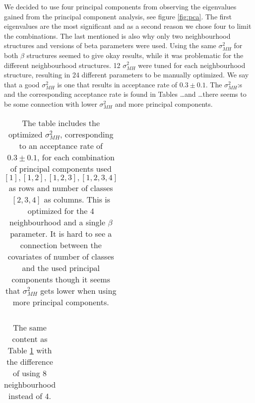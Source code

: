 \documentclass[a4paper,english]{article}
\begin{document}
We decided to use four principal components from observing the eigenvalues gained from the principal component analysis, see figure \ref{fig:pca}. The first eigenvalues are the most significant and as a second reason we chose four to limit the combinations. The last mentioned is also why only two neighbourhood structures and versions of beta parameters were used.
Using the same $\sigma_{MH}^2$ for both $\beta$ structures seemed to give okay results, while it was problematic for the different neighbourhood structures. 12 $\sigma_{MH}^2$ were tuned for each neighbourhood structure, resulting in 24 different parameters to be manually optimized.
We say that a good $\sigma_{MH}^2$ is one that results in acceptance rate of $0.3 \pm 0.1$.
The $\sigma_{MH}^2$:s and the corresponding acceptance rate is found in Tables \dots and \dots there seems to be some connection with lower $\sigma_{MH}^2$ and more principal components.

\begin{table}
  \centering
  \begin{tabular}{c c c}
    
  \end{tabular}
  \caption{The table includes the optimized $\sigma_{MH}^2$, corresponding to an acceptance rate of $0.3 \pm 0.1$, for each combination of principal components used ${[1], [1,2], [1,2,3], [1,2,3,4]}$ as rows and number of classes $[2, 3, 4]$ as columns. This is optimized for the 4 neighbourhood and a single $\beta$ parameter. It is hard to see a connection between the covariates of number of classes and the used principal components though it seems that $\sigma_{MH}^2$ gets lower when using more principal components.}
  \label{tab:sigma:n1}
\end{table}

\begin{table}
  \centering
  \begin{tabular}{c c c}
%    
  \end{tabular}
  \caption{The same content as Table \ref{tab:sigma:n1} with the difference of using 8 neighbourhood instead of 4.}
  \label{tab:sigma:n2}
\end{table}
\end{document}
